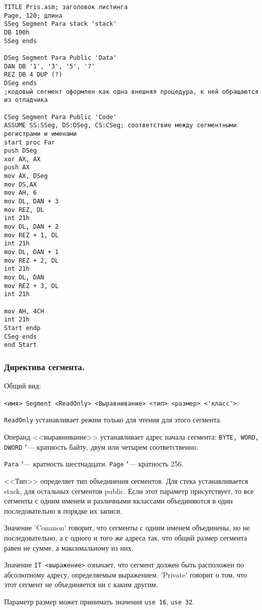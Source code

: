 \begin{verbatim}
TITLE Pris.asm; заголовок листинга
Page, 120; длина
SSeg Segment Para stack 'stack'
DB 100h
SSeg ends

DSeg Segment Para Public 'Data'
DAN DB '1', '3', '5', '7'
REZ DB 4 DUP (?)
DSeg ends
;кодовый сегмент оформлен как одна внешняя процедура, к ней обращаются из отладчика

CSeg Segment Para Public 'Code'
ASSUME SS:SSeg, DS:DSeg, CS:CSeg; соответствие между сегментными регистрами и именами
start proc Far
push DSeg
xor AX, AX
push AX
mov AX, DSeg
mov DS,AX
mov AH, 6
mov DL, DAN + 3
mov REZ, DL
int 21h
mov DL, DAN + 2
mov REZ + 1, DL
int 21h
mov DL, DAN + 1
mov REZ + 2, DL
int 21h
mov DL, DAN
mov REZ + 3, DL
int 21h

mov AH, 4CH
int 21h
Start endp
CSeg ends
end Start
\end{verbatim}


\subsubsection{Директива сегмента.}

Общий вид:

\verb|<имя> Segment <ReadOnly> <Выравнивание> <тип> <размер> <'класс'>|.

\verb|ReadOnly| устанавливает режим только для чтения для этого сегмента.

Операнд <<выравнивание>> устанавливает адрес начала сегмента:
\verb|BYTE, WORD, DWORD| "--- кратность байту, двум или четырем соответственно.

\verb|Para| "--- кратность шестнадцати. \verb|Page| "--- кратность 256.

<<Тип>> определяет тип объединения сегментов. Для стека устанавливается stack, для остальных сегментов public.
Если этот параметр присутствует, то все сегменты с одним именем и различными кклассами объединяются в один
последовательно в порядке их записи.

Значение 'Common' говорит, что сегменты с одним именем объединены, но не последовательно, а с одного и того же
адреса так, что общий размер сегмента равен не сумме, а максимальному из них.

Значение \verb|IT <выражение>| означает, что сегмент должен быть расположен по абсолютному адресу, определяемым выражением.
'Private' говорит о том, что этот сегмент не объединяется ни с каким другим.

Параметр размер может принимать значения \verb|use 16|, \verb|use 32|.
